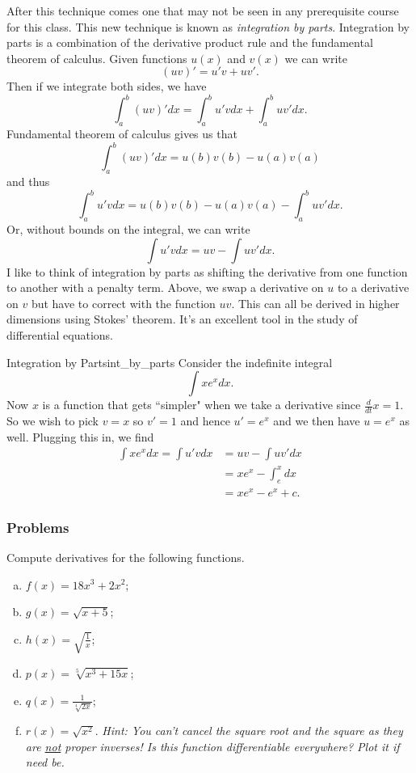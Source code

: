     After this technique comes one that may not be seen in any prerequisite course for this class.  This new technique is known as \emph{integration by parts}. Integration by parts is a combination of the derivative product rule and the fundamental theorem of calculus.  Given functions $u(x)$ and $v(x)$ we can write
    \[
    (uv)'=u'v+uv'.
    \]
    Then if we integrate both sides, we have
    \[
    \int_a^b (uv)'dx = \int_a^b u'vdx + \int_a^b uv'dx.
    \]
    Fundamental theorem of calculus gives us that
    \[
    \int_a^b (uv)'dx = u(b)v(b)-u(a)v(a)
    \]
    and thus
    \[
    \int_a^b u'vdx = u(b)v(b)-u(a)v(a)-\int_a^b uv'dx.
    \]
    Or, without bounds on the integral, we can write
    \[
    \int u'vdx = uv - \int uv'dx.
    \]
    I like to think of integration by parts as shifting the derivative from one function to another with a penalty term.  Above, we swap a derivative on $u$ to a derivative on $v$ but have to correct with the function $uv$.  This can all be derived in higher dimensions using Stokes' theorem. It's an excellent tool in the study of differential equations.
    
    \begin{ex}{Integration by Parts}{int_by_parts}
        Consider the indefinite integral
        \[
        \int xe^x dx.
        \]
        Now $x$ is a function that gets ``simpler" when we take a derivative since $\frac{d}{dt}x= 1$.  So we wish to pick $v=x$ so $v'=1$ and hence $u'=e^x$ and we then have $u=e^x$ as well.  Plugging this in, we find
        \begin{align*}
            \int xe^x dx = \int u'vdx &= uv - \int uv'dx\\
            &= xe^x-\int_e^xdx\\
            &= xe^x - e^x + c.
        \end{align*}
    \end{ex}
    
    \subsubsection{Problems}
    
    \begin{problem}
    Compute derivatives for the following functions.
    \begin{enumerate}[(a)]
        \item $f(x)=18x^3+2x^2$;
        \item $g(x)=\sqrt{x+5}$;
        \item $h(x)=\sqrt{\frac{1}{x}}$;
        \item $p(x)=\sqrt[5]{x^3+15x}$;
        \item $q(x)=\frac{1}{\sqrt[4]{2x}}$;
        \item $r(x)=\sqrt{x^2}$. \emph{Hint: You can't cancel the square root and the square as they are \underline{not} proper inverses! Is this function differentiable everywhere? Plot it if need be.}
    \end{enumerate}
    \end{problem}
    
